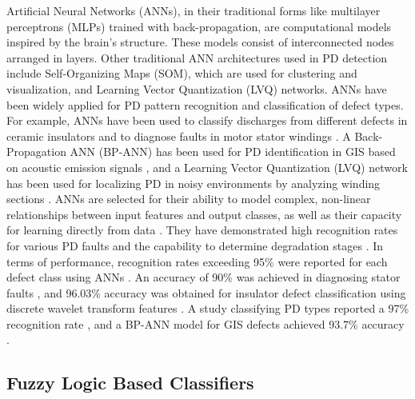 Artificial Neural Networks (ANNs), in their traditional forms like multilayer perceptrons (MLPs) trained with back-propagation, are computational models inspired by the brain's structure. These models consist of interconnected nodes arranged in layers. Other traditional ANN architectures used in PD detection include Self-Organizing Maps (SOM), which are used for clustering and visualization, and Learning Vector Quantization (LVQ) networks. ANNs have been widely applied for PD pattern recognition and classification of defect types. For example, ANNs have been used to classify discharges from different defects in ceramic insulators \parencite{Anjum_2017_1} and to diagnose faults in motor stator windings \parencite{Chen_2018_3}. A Back-Propagation ANN (BP-ANN) has been used for PD identification in GIS based on acoustic emission signals \parencite{Hou_2021_2}, and a Learning Vector Quantization (LVQ) network has been used for localizing PD in noisy environments by analyzing winding sections \parencite{Mohammadirad_2025}. ANNs are selected for their ability to model complex, non-linear relationships between input features and output classes, as well as their capacity for learning directly from data \parencite{Chen_2018_3, Hou_2021_2}. They have demonstrated high recognition rates for various PD faults and the capability to determine degradation stages \parencite{Masud_2016}. In terms of performance, recognition rates exceeding 95\% were reported for each defect class using ANNs \parencite{Anjum_2017_1}. An accuracy of 90\% was achieved in diagnosing stator faults \parencite{Chen_2018_3}, and 96.03\% accuracy was obtained for insulator defect classification using discrete wavelet transform features \parencite{Haiba_2024}. A study classifying PD types reported a 97\% recognition rate \parencite{Zahed_2017_1}, and a BP-ANN model for GIS defects achieved 93.7\% accuracy \parencite{Hou_2021_2}.

\subsection{Fuzzy Logic Based Classifiers}

